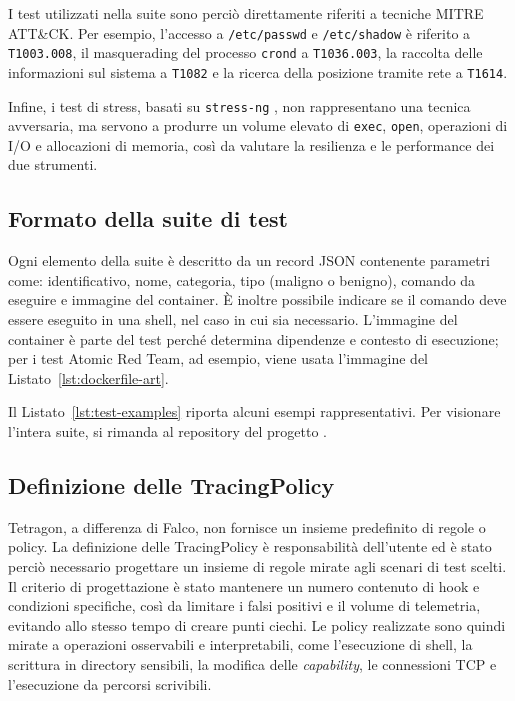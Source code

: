 \documentclass[12pt,a4paper,openright,twoside]{book}
\begin{document}


I test utilizzati nella suite sono perciò direttamente riferiti a tecniche MITRE ATT\&CK. Per esempio, l'accesso a \texttt{/etc/passwd} e \texttt{/etc/shadow} è riferito a \texttt{T1003.008}, il masquerading del processo \texttt{crond} a \texttt{T1036.003}, la raccolta delle informazioni sul sistema a \texttt{T1082} e la ricerca della posizione tramite rete a \texttt{T1614}.

Infine, i test di stress, basati su \texttt{stress-ng} \cite{stress-ng}, non rappresentano una tecnica avversaria, ma servono a produrre un volume elevato di \texttt{exec}, \texttt{open}, operazioni di I/O e allocazioni di memoria, così da valutare la resilienza e le performance dei due strumenti.

\subsection{Formato della suite di test}
\label{sec:formato-suite-test}

Ogni elemento della suite è descritto da un record JSON contenente parametri come: identificativo, nome, categoria, tipo (maligno o benigno), comando da eseguire e immagine del container. È inoltre possibile indicare se il comando deve essere eseguito in una shell, nel caso in cui sia necessario. L'immagine del container è parte del test perché determina dipendenze e contesto di esecuzione; per i test Atomic Red Team, ad esempio, viene usata l'immagine del Listato~\ref{lst:dockerfile-art}.

Il Listato~\ref{lst:test-examples} riporta alcuni esempi rappresentativi. Per visionare l'intera suite, si rimanda al repository del progetto \cite{repo-test-harness}.



\subsection{Definizione delle TracingPolicy}
\label{sec:tracing-policy-design}

Tetragon, a differenza di Falco, non fornisce un insieme predefinito di regole o policy. La definizione delle TracingPolicy è responsabilità dell'utente ed è stato perciò necessario progettare un insieme di regole mirate agli scenari di test scelti. Il criterio di progettazione è stato mantenere un numero contenuto di hook e condizioni specifiche, così da limitare i falsi positivi e il volume di telemetria, evitando allo stesso tempo di creare punti ciechi. Le policy realizzate sono quindi mirate a operazioni osservabili e interpretabili, come l'esecuzione di shell, la scrittura in directory sensibili, la modifica delle \textit{capability}, le connessioni TCP e l'esecuzione da percorsi scrivibili.
\end{document}
